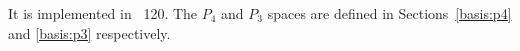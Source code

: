 It is implemented in \stone~120.
The $P_4$ and $P_3$ spaces are defined in Sections~\ref{basis:p4} and \ref{basis:p3} respectively.
